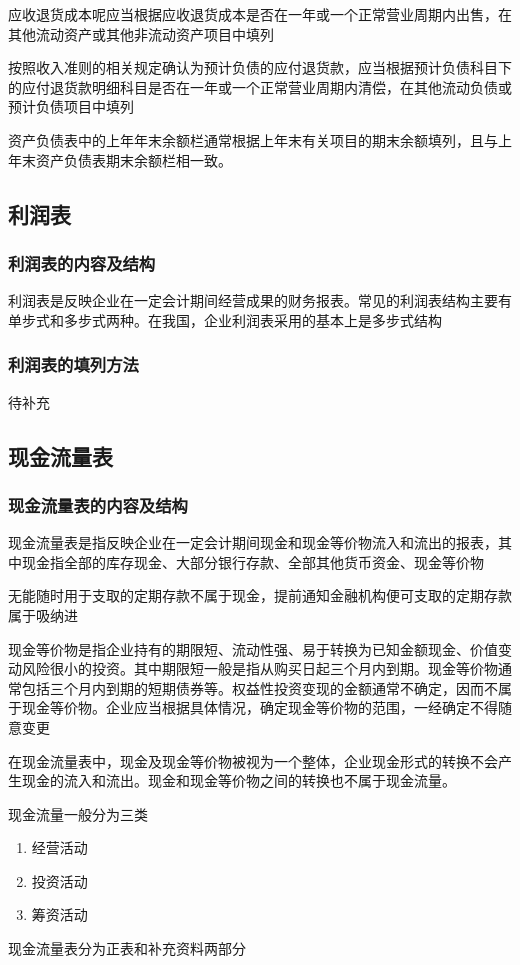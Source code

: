 \documentclass[UTF8,12pt]{ctexart}
\numberwithin{equation}{section} %
\numberwithin{figure}{section}
\numberwithin{table}{section}
\begin{document}
	应收退货成本呢应当根据应收退货成本是否在一年或一个正常营业周期内出售，在其他流动资产或其他非流动资产项目中填列
	
	按照收入准则的相关规定确认为预计负债的应付退货款，应当根据预计负债科目下的应付退货款明细科目是否在一年或一个正常营业周期内清偿，在其他流动负债或预计负债项目中填列
	
	资产负债表中的上年年末余额栏通常根据上年末有关项目的期末余额填列，且与上年末资产负债表期末余额栏相一致。
	
	
	\subsection{利润表}
	\subsubsection{利润表的内容及结构}
	利润表是反映企业在一定会计期间经营成果的财务报表。常见的利润表结构主要有单步式和多步式两种。在我国，企业利润表采用的基本上是多步式结构
	\subsubsection{利润表的填列方法}
	待补充
	
	\subsection{现金流量表}
	\subsubsection{现金流量表的内容及结构}
	现金流量表是指反映企业在一定会计期间现金和现金等价物流入和流出的报表，其中现金指全部的库存现金、大部分银行存款、全部其他货币资金、现金等价物
	
	无能随时用于支取的定期存款不属于现金，提前通知金融机构便可支取的定期存款属于吸纳进
	
	现金等价物是指企业持有的期限短、流动性强、易于转换为已知金额现金、价值变动风险很小的投资。其中期限短一般是指从购买日起三个月内到期。现金等价物通常包括三个月内到期的短期债券等。权益性投资变现的金额通常不确定，因而不属于现金等价物。企业应当根据具体情况，确定现金等价物的范围，一经确定不得随意变更
	
	在现金流量表中，现金及现金等价物被视为一个整体，企业现金形式的转换不会产生现金的流入和流出。现金和现金等价物之间的转换也不属于现金流量。
	
	现金流量一般分为三类
	\begin{enumerate}
		\item 经营活动
		
		\item 投资活动
		
		\item 筹资活动
	\end{enumerate}
	现金流量表分为正表和补充资料两部分
	
\end{document}
